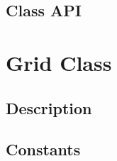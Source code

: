 \documentclass[english]{article}
\begin{document}
\subsection{Class API}

%
%
%
%
%
%
%
%
%
\section{Grid Class}
\subsection{Description}

\subsection{Constants}

\end{document}
